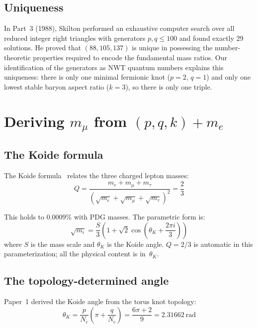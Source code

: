 \documentclass[11pt,a4paper]{article}
\begin{document}
\subsection{Uniqueness}

In Part~3 (1988), Skilton performed an exhaustive computer search over all reduced integer right triangles with generators $p, q \leq 100$ and found exactly 29 solutions. He proved that $(88, 105, 137)$ is unique in possessing the number-theoretic properties required to encode the fundamental mass ratios. Our identification of the generators as NWT quantum numbers explains this uniqueness: there is only one minimal fermionic knot ($p=2$, $q=1$) and only one lowest stable baryon aspect ratio ($k=3$), so there is only one triple.

\section{Deriving $m_\mu$ from $(p, q, k) + m_e$}
\label{sec:muon}

\subsection{The Koide formula}

The Koide formula~\cite{koide1983} relates the three charged lepton masses:
\begin{equation}
  Q = \frac{m_e + m_\mu + m_\tau}{(\sqrt{m_e} + \sqrt{m_\mu} + \sqrt{m_\tau})^2} = \frac{2}{3}
  \label{eq:koide}
\end{equation}

This holds to 0.0009\% with PDG masses. The parametric form is:
\begin{equation}
  \sqrt{m_i} = \frac{S}{3}\left(1 + \sqrt{2}\cos\!\left(\theta_K + \frac{2\pi i}{3}\right)\right)
  \label{eq:koide-param}
\end{equation}
where $S$ is the mass scale and $\theta_K$ is the Koide angle. $Q = 2/3$ is automatic in this parameterization; all the physical content is in~$\theta_K$.

\subsection{The topology-determined angle}

Paper~1 derived the Koide angle from the torus knot topology:
\begin{equation}
  \theta_K = \frac{p}{N_c}\!\left(\pi + \frac{q}{N_c}\right) = \frac{6\pi + 2}{9} = 2.31662~\text{rad}
  \label{eq:koide-angle}
\end{equation}
\end{document}
